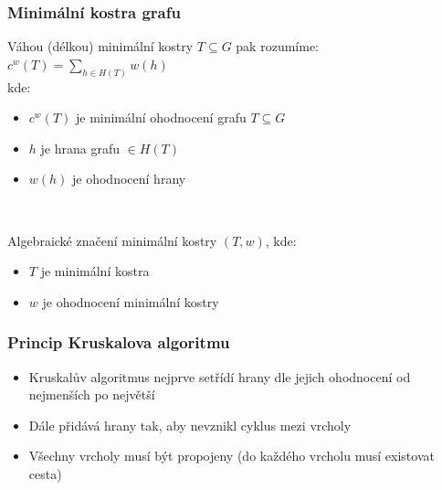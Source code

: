 \documentclass[hidelinks, 10pt, pdf, hyperref={unicode}]{beamer}
\begin{document}
    \begin{frame}
        \frametitle{Minimální kostra grafu}
        Váhou (délkou) minimální kostry $T \subseteq G$ pak rozumíme:\\ \vspace{2pt}
        \centering
        $c^{w}(T)=\sum_{h\in H(T)}w(h)$ \\
        kde: 
        \begin{itemize}
            \item{$c^w(T)$ je minimální ohodnocení grafu $T \subseteq G$}
            \item{$h$ je hrana grafu $\in H(T)$}
            \item{$w(h)$ je ohodnocení hrany}
        \end{itemize}\
        \begin{block}{Algebraické značení minimální kostry}
            $(T,w)$, kde:
            \begin{itemize}
                \item{$T$ je minimální kostra}
                \item{$w$ je ohodnocení minimální kostry}
            \end{itemize}
        \end{block}
    \end{frame}

    \begin{frame}
        \frametitle{Princip Kruskalova algoritmu}
        \begin{itemize}
            \item{Kruskalův algoritmus nejprve setřídí hrany dle jejich ohodnocení od nejmenších po největší}
            \item{Dále přidává hrany tak, aby nevznikl cyklus mezi vrcholy}
            \item{Všechny vrcholy musí být propojeny (do každého vrcholu musí existovat cesta)} 
        \end{itemize}
    \end{frame}
\end{document}
